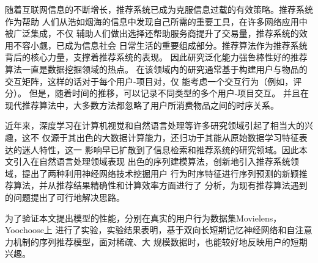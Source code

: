 \begin{cabstract}

    随着互联网信息的不断增长，推荐系统已成为克服信息过载的有效策略。推荐系统作为帮助%
    人们从浩如烟海的信息中发现自己所需的重要工具，在许多网络应用中被广泛集成，不仅%
    辅助人们做出选择还帮助服务商提升了交易量，推荐系统的效用不容小觑，已成为信息社会%
    日常生活的重要组成部分。推荐算法作为推荐系统背后的核心力量，支撑着推荐系统的表现。%
    因此研究泛化能力强鲁棒性好的推荐算法一直是数据挖掘领域的热点。
    在该领域内的研究通常基于构建用户与物品的交互矩阵，这样的话对于每个用户-项目对，仅%
    能考虑一个交互行为（例如，评分）。
    但是，随着时间的推移，可以记录不同类型的多个用户-项目交互。
    并且在现代推荐算法中，大多数方法都忽略了用户所消费物品之间的时序关系。

    近年来，深度学习在计算机视觉和自然语言处理等许多研究领域引起了相当大的兴趣，这不%
    仅源于其出色的大数据计算能力，还归功于其能从原始数据学习特征表达的迷人特性，这一%
    影响早已扩散到了信息检索和推荐系统的研究领域。因此本文引入在自然语言处理领域表现
    出色的序列建模算法，创新地引入推荐系统领域，提出了两种利用神经网络技术挖掘用户%
    行为时序特征进行序列预测的新颖推荐算法，并从推荐结果精确性和计算效率方面进行了%
    分析，为现有推荐算法遇到的问题提出了可行地解决思路。

    为了验证本文提出模型的性能，分别在真实的用户行为数据集Movielens，Yoochoose上%
    进行了实验，实验结果表明，基于双向长短期记忆神经网络和自注意力机制的序列推荐模型，面对稀疏、大%
    规模数据时，也能较好地反映用户的短期兴趣。

\end{cabstract}

\begin{eabstract}

\end{eabstract}

